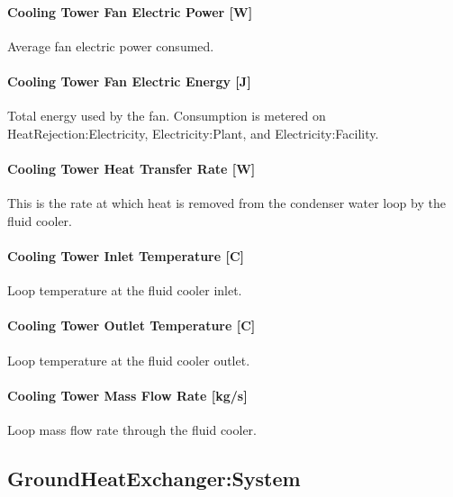 \paragraph{Cooling Tower Fan Electric Power {[}W{]}}\label{cooling-tower-fan-electric-power-w-7}

Average fan electric power consumed.

\paragraph{Cooling Tower Fan Electric Energy {[}J{]}}\label{cooling-tower-fan-electric-energy-j-7}

Total energy used by the fan. Consumption is metered on HeatRejection:Electricity, Electricity:Plant, and Electricity:Facility.

\paragraph{Cooling Tower Heat Transfer Rate {[}W{]}}\label{cooling-tower-heat-transfer-rate-w-7}

This is the rate at which heat is removed from the condenser water loop by the fluid cooler.

\paragraph{Cooling Tower Inlet Temperature {[}C{]}}\label{cooling-tower-inlet-temperature-c-7}

Loop temperature at the fluid cooler inlet.

\paragraph{Cooling Tower Outlet Temperature {[}C{]}}\label{cooling-tower-outlet-temperature-c-7}

Loop temperature at the fluid cooler outlet.

\paragraph{Cooling Tower Mass Flow Rate {[}kg/s{]}}\label{cooling-tower-mass-flow-rate-kgs-7}

Loop mass flow rate through the fluid cooler.

\subsection{GroundHeatExchanger:System}\label{groundheatexchangersystem}

